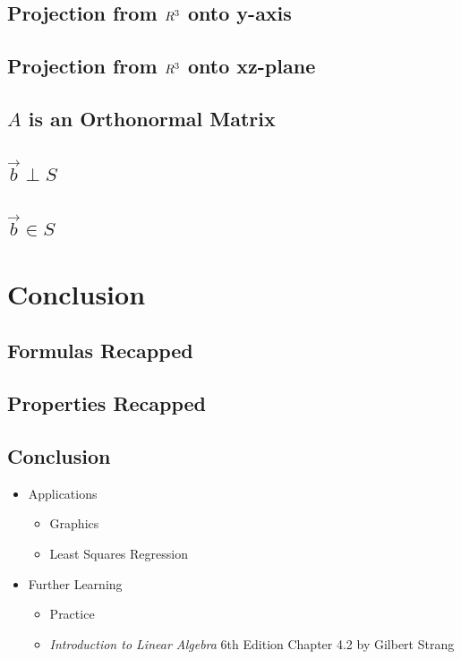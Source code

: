 \documentclass[12pt]{beamer}
\begin{document}
\subsection{Projection from $\boldmath{R}^3$ onto y-axis}

\subsection{Projection from $\boldmath{R}^3$ onto xz-plane}

\subsection{$A$ is an Orthonormal Matrix}

\subsection{$\vec{b} \perp S$}

\subsection{$\vec{b} \in S$}

\section{Conclusion}

\subsection{Formulas Recapped}

\subsection{Properties Recapped}

\subsection{Conclusion}

\begin{frame}
    \begin{itemize}
        \item Applications
              \begin{itemize}
                  \item Graphics
                  \item Least Squares Regression
              \end{itemize}
        \item Further Learning
              \begin{itemize}
                  \item Practice
                  \item \textit{Introduction to Linear Algebra} 6th Edition Chapter 4.2 by Gilbert Strang
              \end{itemize}
    \end{itemize}
\end{frame}
\end{document}
